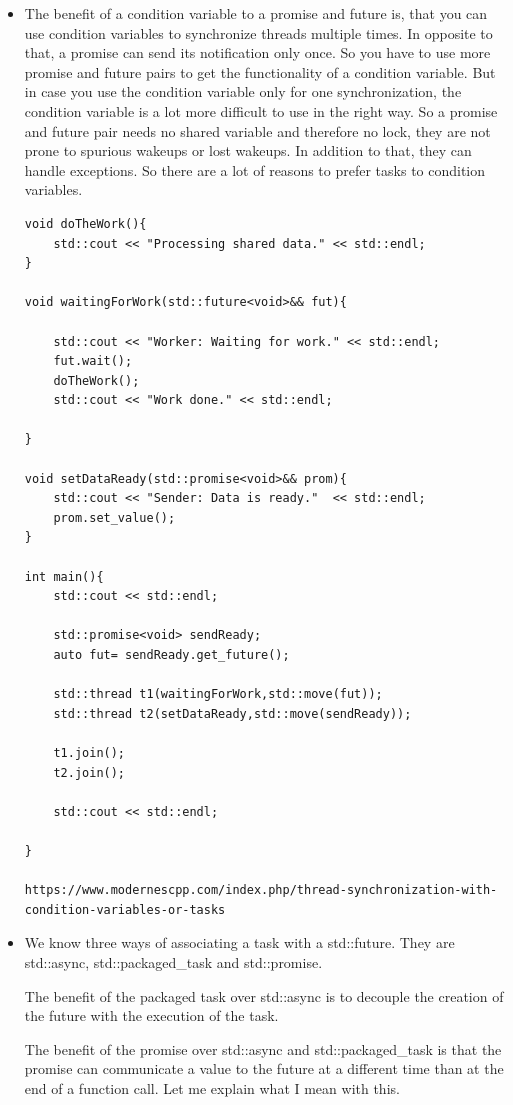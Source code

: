\documentclass[a4paper,11pt,twoside]{book}
\begin{document}
\begin{itemize}
\item The benefit of a condition variable to a promise and future is, that you can use condition variables to synchronize threads multiple times. In opposite to that, a promise can send its notification only once. So you have to use more promise and future pairs to get the functionality of a condition variable. But in case you use the condition variable only for one synchronization, the condition variable is a lot more difficult to use in the right way. So a promise and future pair needs no shared variable and therefore no lock, they are not prone to spurious wakeups or lost wakeups. In addition to that, they can handle exceptions. So there are a lot of reasons to prefer tasks to condition variables.
\begin{lstlisting}[numbers=none]
void doTheWork(){
	std::cout << "Processing shared data." << std::endl;
}

void waitingForWork(std::future<void>&& fut){
	
	std::cout << "Worker: Waiting for work." << std::endl;
	fut.wait();
	doTheWork();
	std::cout << "Work done." << std::endl;
	
}

void setDataReady(std::promise<void>&& prom){
	std::cout << "Sender: Data is ready."  << std::endl;
	prom.set_value();	
}

int main(){
	std::cout << std::endl;
	
	std::promise<void> sendReady;
	auto fut= sendReady.get_future();
	
	std::thread t1(waitingForWork,std::move(fut));
	std::thread t2(setDataReady,std::move(sendReady));
	
	t1.join();
	t2.join();
	
	std::cout << std::endl;
	
}

https://www.modernescpp.com/index.php/thread-synchronization-with-condition-variables-or-tasks
\end{lstlisting}

\item We know three ways of associating a task with a std::future. They are std::async, std::packaged\_task and std::promise.

The benefit of the packaged task over std::async is to decouple the creation of the future with the execution of the task.

The benefit of the promise over std::async and std::packaged\_task is that the promise can communicate a value to the future at a different time than at the end of a function call. Let me explain what I mean with this.

\end{itemize}
\end{document}
